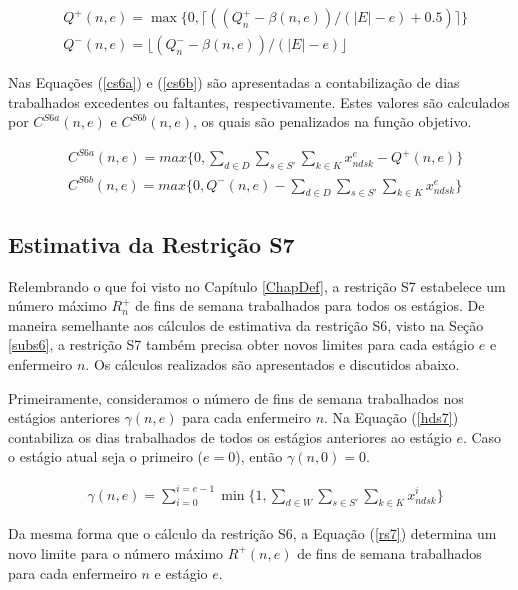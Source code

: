 \documentclass[cic,tc, twoside]{iiufrgs}
\begin{document}
\begin{align}
& Q^{+}(n,e) = \max\{0, \lceil (( Q^+_{n} - \beta(n,e)) / (|E|-e) + 0.5)\rceil\} \label{ests6a}\\
& Q^{-}(n,e) = \lfloor ( Q^-_{n} - \beta(n,e)) / (|E|-e) \rfloor   \label{ests6b} 
\end{align}

Nas Equações (\ref{cs6a}) e (\ref{cs6b}) são apresentadas a contabilização de dias trabalhados excedentes ou faltantes, respectivamente. 
Estes valores são calculados por $C^{S6a}(n,e)$ e $C^{S6b}(n,e)$, os quais são penalizados na função objetivo.

\begin{align}
& C^{S6a}(n,e) = max\{0, \sum_{d \in D} \sum_{s \in S'}\sum_{k \in K} x^e_{ndsk} -  Q^{+}(n,e)\} \label{cs6a}\\
& C^{S6b}(n,e) = max\{0,  Q^{-}(n,e) - \sum_{d \in D} \sum_{s \in S'}\sum_{k \in K} x^e_{ndsk}\} \label{cs6b} 
\end{align}

\subsection{Estimativa da Restrição S7}\label{subs7}

Relembrando o que foi visto no Capítulo \ref{ChapDef}, a restrição S7 estabelece um número máximo $R^+_{n}$ de fins de semana trabalhados para todos os estágios. De maneira semelhante aos cálculos de estimativa da restrição S6, visto na Seção \ref{subs6}, a restrição S7 também precisa obter novos limites para cada estágio $e$ e enfermeiro $n$. Os cálculos realizados são apresentados e discutidos abaixo.

Primeiramente, consideramos o número de fins de semana trabalhados nos estágios anteriores $\gamma(n,e)$ para cada enfermeiro $n$. Na Equação (\ref{hds7})  contabiliza os dias trabalhados de todos os estágios anteriores ao estágio $e$. Caso o estágio atual seja o primeiro ($e=0$), então $\gamma(n,0)=0$.  

\vspace{-0.8cm}

\begin{align}
& \gamma(n,e) = \sum_{i=0}^{i=e-1} \min\{1, \sum_{d \in W} \sum_{s \in S'}\sum_{k \in K}x^i_{ndsk}\}  \label{hds7} 
\end{align}

Da mesma forma que o cálculo da restrição S6, a Equação (\ref{rs7}) determina um novo limite para o número máximo $R^{+}(n,e)$ de fins de semana trabalhados para cada enfermeiro $n$ e estágio $e$. 
\end{document}
